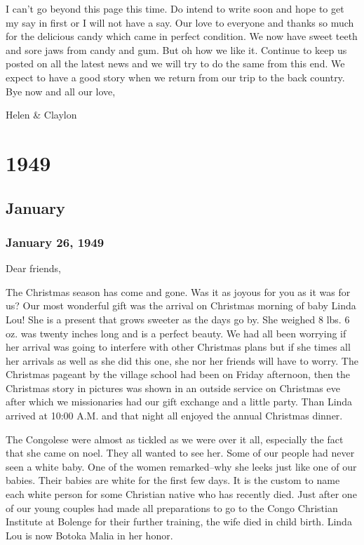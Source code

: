 \documentclass[
]{book}
\begin{document}
I can't go beyond this page this time. Do intend to write soon and hope to get my say in first or I will not have a say. Our love to everyone and thanks so much for the delicious candy which came in perfect condition. We now have sweet teeth and sore jaws from candy and gum. But oh how we like it. Continue to keep us posted on all the latest news and we will try to do the same from this end. We expect to have a good story when we return from our trip to the back country. Bye now and all our love,

Helen \& Claylon

\hypertarget{section-1}{%
\chapter{1949}\label{section-1}}

\hypertarget{january}{%
\section{January}\label{january}}

\hypertarget{january-26-1949}{%
\subsection{January 26, 1949}\label{january-26-1949}}

Dear friends,

The Christmas season has come and gone. Was it as joyous for you as it was for us? Our most wonderful gift was the arrival on Christmas morning of baby Linda Lou! She is a present that grows sweeter as the days go by. She weighed 8 lbs. 6 oz. was twenty inches long and is a perfect beauty. We had all been worrying if her arrival was going to interfere with other Christmas plans but if she times all her arrivals as well as she did this one, she nor her friends will have to worry. The Christmas pageant by the village school had been on Friday afternoon, then the Christmas story in pictures was shown in an outside service on Christmas eve after which we missionaries had our gift exchange and a little party. Than Linda arrived at 10:00 A.M. and that night all enjoyed the annual Christmas dinner.

The Congolese were almost as tickled as we were over it all, especially the fact that she came on noel. They all wanted to see her. Some of our people had never seen a white baby. One of the women remarked--why she leeks just like one of our babies. Their babies are white for the first few days. It is the custom to name each white person for some Christian native who has recently died. Just after one of our young couples had made all preparations to go to the Congo Christian Institute at Bolenge for their further training, the wife died in child birth. Linda Lou is now Botoka Malia in her honor.
\end{document}
